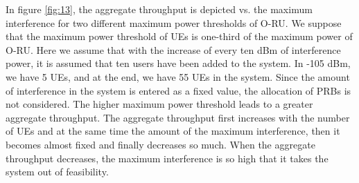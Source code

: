 \documentclass[lettersize,journal]{IEEEtran}
\begin{document}

In figure \ref{fig:13}, the aggregate throughput is depicted vs. the maximum interference for two different maximum power thresholds of O-RU. We suppose that the maximum power threshold of UEs is one-third of the maximum power of O-RU.
Here we assume that with the increase of every ten dBm of interference power, it is assumed that ten users have been added to the system. In -105 dBm, we have 5 UEs, and at the end, we have 55 UEs in the system.
Since the amount of interference in the system is entered as a fixed value,
the allocation of PRBs is not considered.
The higher maximum power threshold leads to a greater aggregate throughput. 
The aggregate throughput first increases with the number of UEs and at the same time the amount of the maximum interference, then it becomes almost fixed and finally decreases so much. When the aggregate throughput decreases, the maximum interference is so high that it takes the system out of feasibility.
\end{document}

